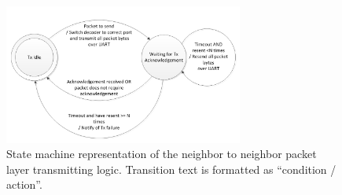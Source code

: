 \begin{figure}[h]
	\centering
	\includegraphics[width=0.7\textwidth]{Figures/state-machine-packet-layer-tx.png}
	\caption{State machine representation of the neighbor to neighbor packet layer transmitting logic. Transition text is formatted as ``condition / action''.}
	\label{fig:state-machine-packet-layer-tx}    
\end{figure}